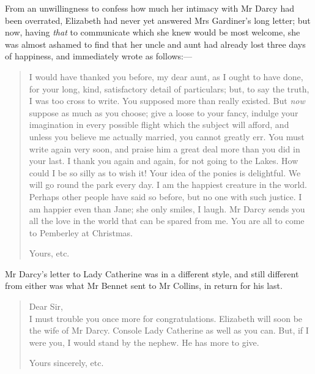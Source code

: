 From an unwillingness to confess how much her intimacy with Mr Darcy had been overrated, Elizabeth had never yet answered Mrs Gardiner's long letter; but now, having \textit{that} to communicate which she knew would be most welcome, she was almost ashamed to find that her uncle and aunt had already lost three days of happiness, and immediately wrote as follows:—

\begin{quotation}

\indent I would have thanked you before, my dear aunt, as I ought to have done, for your long, kind, satisfactory detail of particulars; but, to say the truth, I was too cross to write. You supposed more than really existed. But \textit{now} suppose as much as you choose; give a loose to your fancy, indulge your imagination in every possible flight which the subject will afford, and unless you believe me actually married, you cannot greatly err. You must write again very soon, and praise him a great deal more than you did in your last. I thank you again and again, for not going to the Lakes. How could I be so silly as to wish it! Your idea of the ponies is delightful. We will go round the park every day. I am the happiest creature in the world. Perhaps other people have said so before, but no one with such justice. I am happier even than Jane; she only smiles, I laugh. Mr Darcy sends you all the love in the world that can be spared from me. You are all to come to Pemberley at Christmas.\\

\begin{flushright}
Yours, etc.
\end{flushright}
\end{quotation}



Mr Darcy's letter to Lady Catherine was in a different style, and still different from either was what Mr Bennet sent to Mr Collins, in return for his last.

\begin{quotation}
\noindent Dear Sir,\\

\indent I must trouble you once more for congratulations. Elizabeth will soon be the wife of Mr Darcy. Console Lady Catherine as well as you can. But, if I were you, I would stand by the nephew. He has more to give.

\begin{flushright}
Yours sincerely, etc.
\end{flushright}
\end{quotation}


